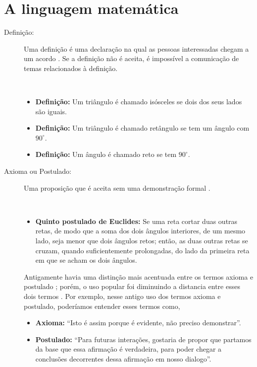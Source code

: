 
\section{A linguagem matemática}

\begin{description}

\item[Definição:]  Uma definição é uma declaração na qual as 
pessoas interessadas chegam a um acordo \cite[pp. 37]{solow1987como}.
Se a definição não é aceita, é impossível a comunicação de temas relacionados à definição.
\begin{example}~\\
\begin{itemize}
\item \textbf{Definição:} Um triângulo é chamado isósceles se dois dos seus lados são iguais.
\item \textbf{Definição:} Um triângulo é chamado retângulo se tem um ângulo com $90^{\circ}$.
\item \textbf{Definição:} Um ângulo é chamado reto se tem  $90^{\circ}$.
\end{itemize}
\end{example}

\item[Axioma ou Postulado:]   
Uma proposição que é aceita sem uma demonstração formal \cite[pp. 47]{fossa2009introducao} \cite[pp. 41]{solow1987como}.
\begin{example}~\\
\begin{itemize}
\item \textbf{Quinto postulado de Euclides:} 
Se uma reta cortar duas outras retas, de modo que a soma dos dois ângulos interiores, 
de um mesmo lado, seja menor que dois ângulos retos; então, as duas outras retas se cruzam, 
quando suficientemente prolongadas, do lado da primeira reta em que se acham os dois ângulos.
\end{itemize}
\end{example}

Antigamente havia uma distinção mais acentuada entre os termos axioma e postulado \cite[pp. 115]{de1863ensaio};
porém, o uso popular foi diminuindo a distancia entre esses dois termos \cite[pp. 243]{mora2000dicionario}.
Por exemplo, nesse antigo uso dos termos axioma e postulado, poderíamos entender esses termos como,
\begin{itemize}
\item \textbf{Axioma:} ``Isto é assim porque é evidente, não preciso demonstrar''.
\item \textbf{Postulado:} ``Para futuras interações, 
gostaria de propor que partamos da base que essa afirmação é verdadeira,
 para poder chegar a conclusões decorrentes dessa afirmação em nosso dialogo''.
\end{itemize}



\end{description}
